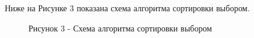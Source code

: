\documentclass[14pt, a4paper]{extarticle}
\begin{document}
	\clearpage
	Ниже на Рисунке 3 показана схема алгоритма сортировки выбором.
	\begin{figure}[h!]
		\caption*{Рисунок 3 - Схема алгоритма сортировки выбором}
	\end{figure}
	
	\clearpage
\end{document}
